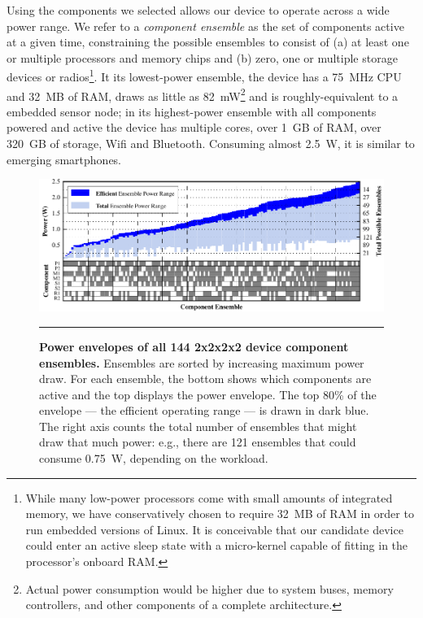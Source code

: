 Using the components we selected allows our device to operate across a wide
power range. We refer to a \textit{component ensemble} as the set of
components active at a given time, constraining the possible ensembles to
consist of (a) at least one or multiple processors and memory chips and (b)
zero, one or multiple storage devices or radios\footnote{While many low-power
processors come with small amounts of integrated memory, we have
conservatively chosen to require 32~MB of RAM in order to run embedded
versions of Linux. It is conceivable that our candidate device could enter an
active sleep state with a micro-kernel capable of fitting in the processor's
onboard RAM.}. It its lowest-power ensemble, the device has a 75~MHz CPU and
32~MB of RAM, draws as little as 82~mW\footnote{Actual power consumption
would be higher due to system buses, memory controllers, and other components
of a complete architecture.} and is roughly-equivalent to a embedded sensor
node; in its highest-power ensemble with all components powered and active
the device has multiple cores, over 1~GB of RAM, over 320~GB of storage, Wifi
and Bluetooth. Consuming almost 2.5~W, it is similar to emerging smartphones.

\begin{figure}[t]
\includegraphics{./figures/componentgraph.pdf}

\caption{\small \textbf{Power envelopes of all 144 2x2x2x2 device component
ensembles.} Ensembles are sorted by increasing maximum power draw. For each
ensemble, the bottom shows which components are active and the top displays
the power envelope. The top 80\% of the envelope --- the efficient operating
range --- is drawn in dark blue. The right axis counts the total number of
ensembles that might draw that much power: e.g., there are
121 ensembles that could consume 0.75~W, depending on the workload.}
\vspace{0.10in}
\hrule
\vspace{-0.20in}
\label{figure-componentgraph}
\end{figure}


